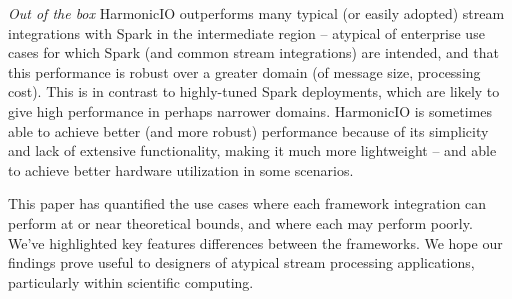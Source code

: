 \documentclass[conference]{IEEEtran}
\begin{document}
\emph{Out of the box} HarmonicIO outperforms many typical (or easily adopted) stream integrations with Spark in the intermediate region -- atypical of enterprise use cases for which Spark (and common stream integrations) are intended, and that this performance is robust over a greater domain (of message size, processing cost). This is in contrast to highly-tuned Spark deployments, which are likely to give high performance in perhaps narrower domains. HarmonicIO is sometimes able to achieve better (and more robust) performance because of its simplicity and lack of extensive functionality, making it much more lightweight -- and able to achieve better hardware utilization in some scenarios.

This paper has quantified the use cases where each framework integration can perform at or near theoretical bounds, and where each may perform poorly. We've highlighted key features differences between the frameworks. We hope our findings prove useful 
to designers of atypical stream processing applications, particularly within scientific computing.

\end{document}
